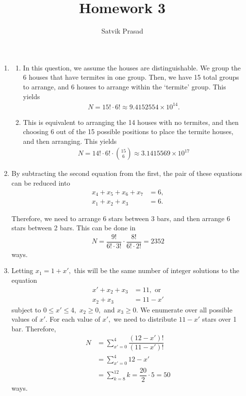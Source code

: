 \documentclass[12pt]{article}
\title{Homework 3}
\author{Satvik Prasad}
\date{}
\begin{document}
\begin{enumerate}
  \item
    \begin{enumerate}
      \item In this question, we assume the houses are
        distinguishable. We group the 6 houses that have termites in
        one group. Then, we have 15 total groups to arrange, and 6
        houses to arrange within the `termite' group. This yields
        \begin{align*}
          N = 15! \cdot 6! \approx 9.4152554 \times 10^{14}.
        \end{align*}

      \item This is equivalent to arranging the 14 houses with no
        termites, and then choosing 6 out of the 15 possible
        positions to place the termite houses, and then arranging. This yields
        \begin{align*}
          N = 14! \cdot 6! \cdot {15 \choose 6} \approx 3.1415569 \times 10^{17}
        \end{align*}
    \end{enumerate}

  \item By subtracting the second equation from the first, the pair
    of these equations can be reduced into
    \begin{align*}
      x_4 + x_5 + x_6 + x_7 &= 6, \\
      x_1 + x_2 + x_3 &= 6.
    \end{align*}

    Therefore, we need to arrange 6 stars between 3 bars, and then
    arrange 6 stars between 2 bars. This can be done in
    \begin{align*}
      N = \dfrac{9!}{6! \cdot 3!} \cdot \dfrac{8!}{6! \cdot 2!} = 2352
    \end{align*}
    ways.

  \item Letting $x_1 = 1 + x',$ this will be the same number of
    integer solutions to the equation
    \begin{align*}
      x' + x_2 + x_3 &= 11, \text{ or} \\
      x_2 + x_3 &= 11 - x'
    \end{align*}
    subject to $0 \leq x' \leq 4,$ $x_2 \geq 0,$ and $x_3 \geq 0.$ We
    enumerate over all possible values of $x'.$ For each value of
    $x',$ we need to distribute $11 - x'$ stars over 1 bar. Therefore,
    \begin{align*}
      N &= \sum_{x' =0}^{4} \dfrac{(12 - x')!}{(11-x')!} \\
      &= \sum_{x' = 0}^{4} 12 - x' \\
      &= \sum_{k = 8}^{12}k = \dfrac{20}{2} \cdot 5 = 50
    \end{align*}
    ways.
\end{enumerate}
\end{document}

